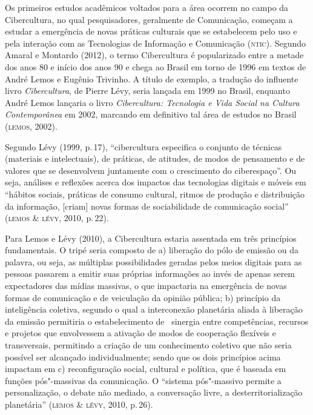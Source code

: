 Os primeiros estudos acadêmicos voltados para a área ocorrem no campo da
Cibercultura, no qual pesquisadores, geralmente de Comunicação,
começam a estudar a emergência de novas práticas culturais que se
estabelecem pelo uso e pela interação com as Tecnologias de Informação e
Comunicação (\textsc{ntic}). Segundo Amaral e Montardo (2012), o termo
Cibercultura é popularizado entre a metade dos anos 80 e início dos anos
90 e chega ao Brasil em torno de 1996 em textos de André Lemos e Eugênio
Trivinho. A título de exemplo, a tradução do influente livro
\emph{Cibercultura}, de Pierre Lévy, seria lançada em 1999 no Brasil,
enquanto André Lemos lançaria o livro \emph{Cibercultura: Tecnologia e
Vida Social na Cultura Contemporânea} em 2002, marcando em definitivo
tal área de estudos no Brasil (\textsc{lemos}, 2002).

Segundo Lévy (1999, p.\,17), ``cibercultura especifica o conjunto de
técnicas (materiais e intelectuais), de práticas, de atitudes, de modos
de pensamento e de valores que se desenvolvem juntamente com o
crescimento do ciberespaço''. Ou seja, análises e reflexões acerca dos
impactos das tecnologias digitais e móveis em ``hábitos sociais,
práticas de consumo cultural, ritmos de produção e distribuição da
informação, {[}criam{]} novas formas de sociabilidade de comunicação
social'' (\textsc{lemos \& lévy}, 2010, p.\,22).

Para Lemos e Lévy (2010), a Cibercultura estaria assentada em três
princípios fundamentais. O tripé seria composto de a) liberação do pólo
de emissão ou da palavra, ou seja, as múltiplas possibilidades geradas
pelos meios digitais para as pessoas passarem a emitir suas próprias
informações ao invés de apenas serem expectadores das mídias massivas, o
que impactaria na emergência de novas formas de comunicação e de
veiculação da opinião pública; b) princípio da inteligência coletiva,
segundo o qual a interconexão planetária aliada à liberação da emissão
permitiria o estabelecimento de ~sinergia entre competências, recursos e
projetos que envolvessem a ativação de modos de cooperação flexíveis e
transversais, permitindo a criação de um conhecimento coletivo que não
seria possível ser alcançado individualmente; sendo que os dois
princípios acima impactam em c) reconfiguração social, cultural e
política, que é baseada em funções pós"-massivas da comunicação. O
``sistema pós"-massivo permite a personalização, o debate não mediado, a
conversação livre, a desterritorialização planetária'' (\textsc{lemos \& lévy},
2010, p.\,26).

